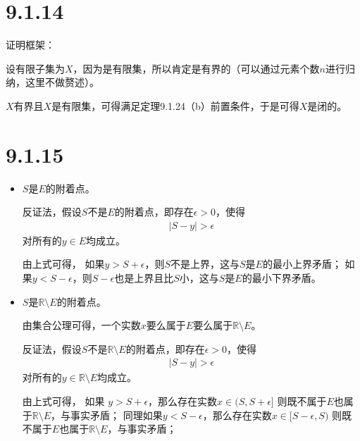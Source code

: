 \documentclass{article}
\begin{document}
\section*{9.1.14}
证明框架：

设有限子集为$X$，因为是有限集，所以肯定是有界的（可以通过元素个数$n$进行归纳，这里不做赘述）。

$X$有界且$X$是有限集，可得满足定理9.1.24（b）前置条件，于是可得$X$是闭的。

\section*{9.1.15}

\begin{itemize}
      \item $S$是$E$的附着点。

            反证法，假设$S$不是$E$的附着点，即存在$\epsilon > 0$，使得
            \begin{align*}
                  |S - y| > \epsilon
            \end{align*}
            对所有的$y \in E$均成立。

            由上式可得，
            如果$y > S + \epsilon$，则$S$不是上界，这与$S$是$E$的最小上界矛盾；
            如果$y < S - \epsilon$，则$S - \epsilon$也是上界且比$S$小，这与$S$是$E$的最小下界矛盾。

      \item $S$是$\mathbb{R} \setminus E$的附着点。

            由集合公理可得，一个实数$x$要么属于$E$要么属于$\mathbb{R} \setminus E$。

            反证法，假设$S$不是$\mathbb{R} \setminus E$的附着点，即存在$\epsilon > 0$，使得
            \begin{align*}
                  |S - y| > \epsilon
            \end{align*}
            对所有的$y \in \mathbb{R} \setminus E$均成立。

            由上式可得，
            如果 $y > S + \epsilon$，那么存在实数$x \in (S, S+\epsilon]$
                  则既不属于$E$也属于$\mathbb{R} \setminus E$，与事实矛盾；
                  同理如果$y < S - \epsilon$，那么存在实数$x \in [S-\epsilon, S)$
            则既不属于$E$也属于$\mathbb{R} \setminus E$，与事实矛盾；
\end{itemize}
\end{document}
